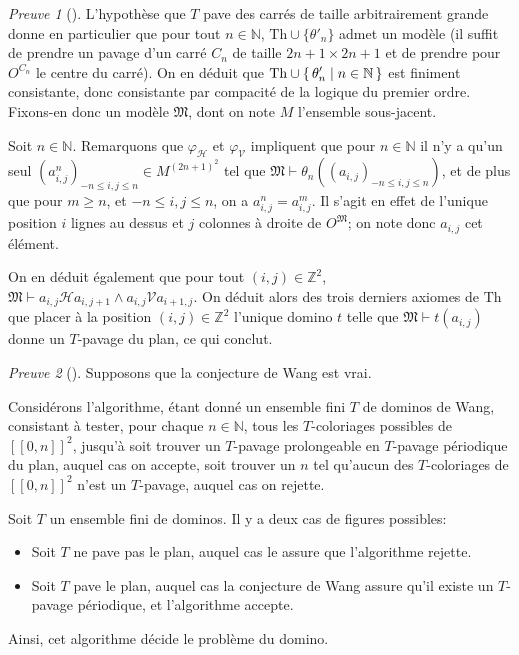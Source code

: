 \documentclass{scrartcl}
\renewcommand{\le}{\leqslant}
\renewcommand{\ge}{\geqslant}
\newcommand{\N}{\mathbb N}
\newcommand{\Z}{\mathbb Z}
\renewcommand{\H}{\mathrel{\mathcal H}}
\newcommand{\V}{\mathrel{\mathcal V}}
\theoremstyle{definition}
\theoremstyle{remark}
\newtheorem*{preuve}{Preuve}
\begin{document}
\begin{preuve}[]
  L'hypothèse que $T$ pave des carrés de taille arbitrairement grande donne en particulier que pour tout $n\in\N$, $\mathrm{Th}\cup \{\theta'_n\}$ admet un modèle (il suffit de prendre un pavage d'un carré $C_n$ de taille $2n+1\times 2n+1$ et de prendre pour $O^{C_n}$ le centre du carré). On en déduit que $\displaystyle\mathrm{Th}\cup \set{\theta'_n|n\in\N}$ est finiment consistante, donc consistante par compacité de la logique du premier ordre. Fixons-en donc un modèle $\mathfrak M$, dont on note $M$ l'ensemble sous-jacent.

  Soit $n\in\N$. Remarquons que $\varphi_\mathcal H$ et $\varphi_\mathcal V$ impliquent que pour $n\in\N$ il n'y a qu'un seul $(a_{i,j}^n)_{-n\le i,j\le n}\in M^{(2n+1)^2}$ tel que $\mathfrak M\vdash \theta_n\left((a_{i,j})_{-n\le i,j\le n}\right)$, et de plus que pour $m\ge n$, et $-n\le i,j\le n$, on a $a_{i,j}^n=a_{i,j}^m$. Il s'agit en effet de l'unique position $i$ lignes au dessus et $j$ colonnes à droite de $O^\mathfrak M$; on note donc $a_{i,j}$ cet élément.

  On en déduit également que pour tout $(i,j)\in\Z^2$, $\mathfrak M\vdash a_{i,j}\H a_{i,j+1}\land a_{i,j}\V a_{i+1,j}$. On déduit alors des trois derniers axiomes de $\mathrm{Th}$ que placer à la position $(i,j)\in\Z^2$ l'unique domino $t$ telle que $\mathfrak M\vdash t(a_{i,j})$ donne un $T$-pavage du plan, ce qui conclut. 
\end{preuve}

\begin{preuve}[]
  Supposons que la conjecture de Wang est vrai.
  
  Considérons l'algorithme, étant donné un ensemble fini $T$ de dominos de Wang, consistant à tester, pour chaque $n\in\N$, tous les $T$-coloriages possibles de $[\![0,n]\!]^2$, jusqu'à soit trouver un $T$-pavage prolongeable en $T$-pavage périodique du plan, auquel cas on accepte, soit trouver un $n$ tel qu'aucun des $T$-coloriages de $[\![0,n]\!]^2$ n'est un $T$-pavage, auquel cas on rejette.

  Soit $T$ un ensemble fini de dominos. Il y a deux cas de figures possibles:
  \begin{itemize}
    \item Soit $T$ ne pave pas le plan, auquel cas le  assure que l'algorithme rejette.
    \item Soit $T$ pave le plan, auquel cas la conjecture de Wang assure qu'il existe un $T$-pavage périodique, et l'algorithme accepte.
  \end{itemize}

  Ainsi, cet algorithme décide le problème du domino.
\end{preuve}
\end{document}
